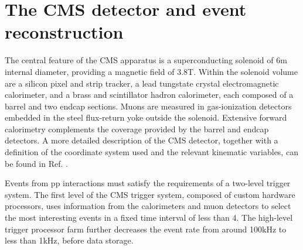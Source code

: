 \section{The CMS detector and event reconstruction}
\label{sect:CMSRec}
The central feature of the CMS apparatus is a superconducting solenoid of 6\unit{m} internal diameter, providing a magnetic field of 3.8\unit{T}. Within the solenoid volume are a silicon pixel and strip tracker, a lead tungstate crystal electromagnetic calorimeter, and a brass and scintillator hadron calorimeter, each composed of a barrel and two endcap sections. Muons are measured in gas-ionization detectors embedded in the steel flux-return yoke outside the solenoid. Extensive forward calorimetry complements the coverage provided by the barrel and endcap detectors. 
A more detailed description of the CMS detector, together with a definition of the coordinate system used and the relevant kinematic variables, can be found in Ref. \cite{Chatrchyan:2008zzk}.


Events from pp interactions must satisfy the requirements of a two-level trigger system.
The first level of the CMS trigger system, composed of custom hardware processors, uses information from the calorimeters and muon detectors to select the most interesting events in a fixed time interval of less than 4\mus. The high-level trigger processor farm further decreases the event rate from around 100\unit{kHz} to less than 1\unit{kHz}, before data storage. 

